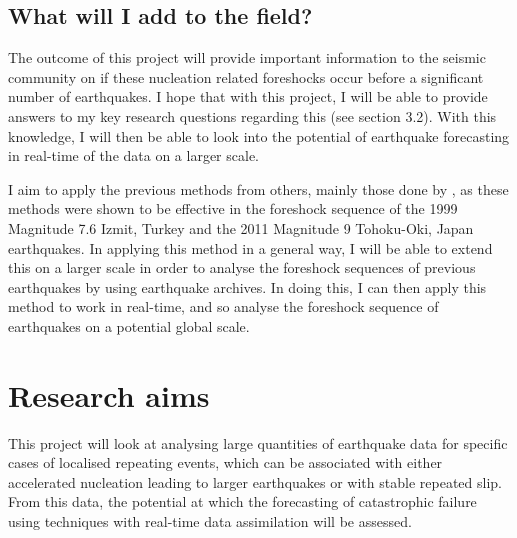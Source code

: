 \documentclass[12pt]{report}
\begin{document}
\section{What will I add to the field?}
 The outcome of this project will provide important information to the seismic community on if these nucleation related foreshocks occur before a significant number of earthquakes. I hope that with this project, I will be able to provide answers to my key research questions regarding this (see section 3.2). With this knowledge, I will then be able to look into the potential of earthquake forecasting in real-time of the data on a larger scale. 
 
 I aim to apply the previous methods from others, mainly those done by \cite{Bouchon2011,Bouchon2013, Kato2012, Kato2014}, as these methods were shown to be effective in the foreshock sequence of the 1999 Magnitude 7.6 Izmit, Turkey and the 2011 Magnitude 9 Tohoku-Oki, Japan earthquakes. In applying this method in a general way, I will be able to extend this on a larger scale in order to analyse the foreshock sequences of previous earthquakes by using earthquake archives. In doing this, I can then apply this method to work in real-time, and so analyse the foreshock sequence of earthquakes on a potential global scale. 



\chapter{Research aims}
This project will look at analysing large quantities of earthquake data for specific cases of localised repeating events, which can be associated with either accelerated nucleation leading to larger earthquakes or with stable repeated slip. From this data, the potential at which the forecasting of catastrophic failure using techniques with real-time data assimilation will be assessed.
\end{document}
